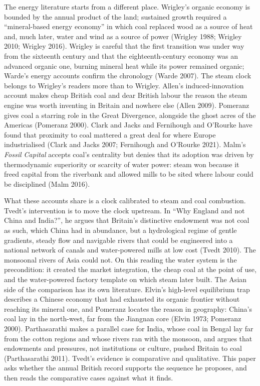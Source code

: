 \documentclass[
  11pt,
]{article}
\begin{document}
The energy literature starts from a different place. Wrigley's organic
economy is bounded by the annual product of the land; sustained growth
required a ``mineral-based energy economy'' in which coal replaced wood
as a source of heat and, much later, water and wind as a source of power
(Wrigley 1988; Wrigley 2010; Wrigley 2016). Wrigley is careful that the
first transition was under way from the sixteenth century and that the
eighteenth-century economy was an advanced organic one, burning mineral
heat while its power remained organic; Warde's energy accounts confirm
the chronology (Warde 2007). The steam clock belongs to Wrigley's
readers more than to Wrigley. Allen's induced-innovation account makes
cheap British coal and dear British labour the reason the steam engine
was worth inventing in Britain and nowhere else (Allen 2009). Pomeranz
gives coal a starring role in the Great Divergence, alongside the ghost
acres of the Americas (Pomeranz 2000). Clark and Jacks and Fernihough
and O'Rourke have found that proximity to coal mattered a great deal for
where Europe industrialised (Clark and Jacks 2007; Fernihough and
O'Rourke 2021). Malm's \emph{Fossil Capital} accepts coal's centrality
but denies that its adoption was driven by thermodynamic superiority or
scarcity of water power: steam won because it freed capital from the
riverbank and allowed mills to be sited where labour could be
disciplined (Malm 2016).

What these accounts share is a clock calibrated to steam and coal
combustion. Tvedt's intervention is to move the clock upstream. In ``Why
England and not China and India?'', he argues that Britain's distinctive
endowment was not coal as such, which China had in abundance, but a
hydrological regime of gentle gradients, steady flow and navigable
rivers that could be engineered into a national network of canals and
water-powered mills at low cost (Tvedt 2010). The monsoonal rivers of
Asia could not. On this reading the water system is the precondition: it
created the market integration, the cheap coal at the point of use, and
the water-powered factory template on which steam later built. The Asian
side of the comparison has its own literature. Elvin's high-level
equilibrium trap describes a Chinese economy that had exhausted its
organic frontier without reaching its mineral one, and Pomeranz locates
the reason in geography: China's coal lay in the north-west, far from
the Jiangnan core (Elvin 1973; Pomeranz 2000). Parthasarathi makes a
parallel case for India, whose coal in Bengal lay far from the cotton
regions and whose rivers ran with the monsoon, and argues that
endowments and pressures, not institutions or culture, pushed Britain to
coal (Parthasarathi 2011). Tvedt's evidence is comparative and
qualitative. This paper asks whether the annual British record supports
the sequence he proposes, and then reads the comparative cases against
what it finds.
\end{document}
